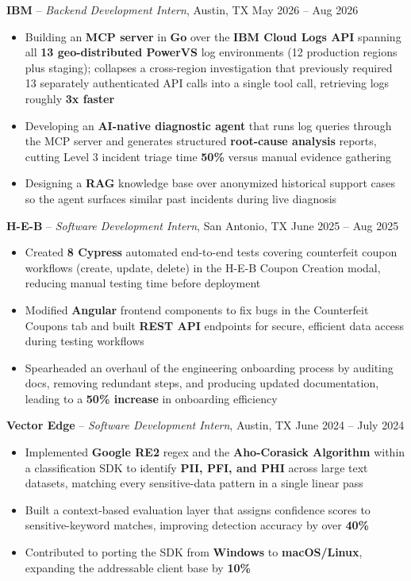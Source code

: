 \documentclass[10pt, letterpaper]{article}
\begin{document}
\textbf{IBM} -- \textit{Backend Development Intern}, Austin, TX \hfill May 2026 -- Aug 2026
\begin{itemize}
  \item Building an \textbf{MCP server} in \textbf{Go} over the \textbf{IBM Cloud Logs API} spanning all \textbf{13 geo-distributed PowerVS} log environments (12 production regions plus staging); collapses a cross-region investigation that previously required 13 separately authenticated API calls into a single tool call, retrieving logs roughly \textbf{3x faster}
  \item Developing an \textbf{AI-native diagnostic agent} that runs log queries through the MCP server and generates structured \textbf{root-cause analysis} reports, cutting Level 3 incident triage time \textbf{50\%} versus manual evidence gathering
  \item Designing a \textbf{RAG} knowledge base over anonymized historical support cases so the agent surfaces similar past incidents during live diagnosis
\end{itemize}

\textbf{H-E-B} -- \textit{Software Development Intern}, San Antonio, TX \hfill June 2025 -- Aug 2025
\begin{itemize}
  \item Created \textbf{8 Cypress} automated end-to-end tests covering counterfeit coupon workflows (create, update, delete) in the H-E-B Coupon Creation modal, reducing manual testing time before deployment
  \item Modified \textbf{Angular} frontend components to fix bugs in the Counterfeit Coupons tab and built \textbf{REST API} endpoints for secure, efficient data access during testing workflows
  \item Spearheaded an overhaul of the engineering onboarding process by auditing docs, removing redundant steps, and producing updated documentation, leading to a \textbf{50\% increase} in onboarding efficiency
\end{itemize}

\textbf{Vector Edge} -- \textit{Software Development Intern}, Austin, TX \hfill June 2024 -- July 2024
\begin{itemize}
  \item Implemented \textbf{Google RE2} regex and the \textbf{Aho-Corasick Algorithm} within a classification SDK to identify \textbf{PII, PFI, and PHI} across large text datasets, matching every sensitive-data pattern in a single linear pass
  \item Built a context-based evaluation layer that assigns confidence scores to sensitive-keyword matches, improving detection accuracy by over \textbf{40\%}
  \item Contributed to porting the SDK from \textbf{Windows} to \textbf{macOS/Linux}, expanding the addressable client base by \textbf{10\%}
\end{itemize}
\end{document}

